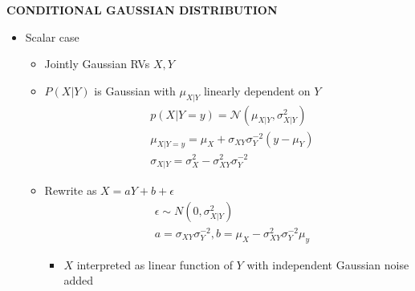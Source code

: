 \begin{whitebox}{\textbf{CONDITIONAL GAUSSIAN DISTRIBUTION}}
\begin{itemize}
\begin{itemize}
\begin{align*}
\begin{bmatrix}
                        \sigma_{i_k,j_1} & \hdots & \sigma_{i_k,j_m}
                    \end{bmatrix}\in\mathbb{R}^{k\times m}
                \end{align*}
        \end{itemize}
        \item Scalar case
        \begin{itemize}
            \item Jointly Gaussian RVs $X,Y$
            \item $P(X|Y)$ is Gaussian with $\mu_{X|Y}$ linearly dependent on $Y$
            \begin{align*}
                &p(X|Y=y)=\mathcal{N}(\mu_{X|Y},\sigma^2_{X|Y})\\
                & \mu_{X | Y=y}=\mu_X+\sigma_{X Y} \sigma_Y^{-2}\left(y-\mu_Y\right) \\
                & \sigma_{X | Y}=\sigma_X^2-\sigma_{X Y}^2 \sigma_Y^{-2}
            \end{align*}
            \item Rewrite as $X=a Y+b+\epsilon$
            \begin{align*}
                &\epsilon \sim N\left(0, \sigma_{X | Y}^2\right) \\
                &a=\sigma_{X Y} \sigma_Y^{-2}, b=\mu_X-\sigma_{X Y}^2 \sigma_Y^{-2} \mu_y
            \end{align*}
            \begin{itemize}
                \item $X$ interpreted as linear function of $Y$ with independent Gaussian noise added
            \end{itemize}
        \end{itemize}
    \end{itemize}
\end{whitebox}



